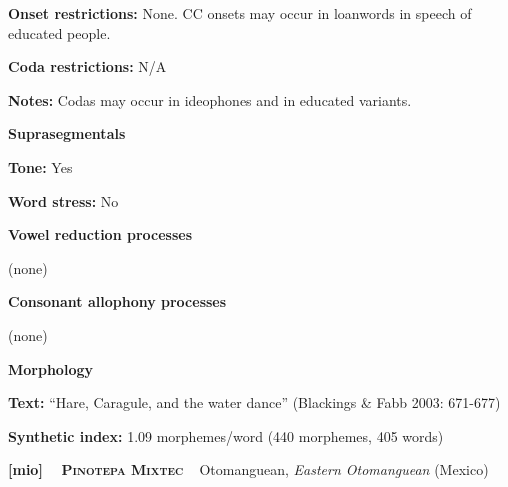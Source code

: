 \begin{styleBody}
\textbf{Onset restrictions:} None. CC onsets may occur in loanwords in speech of educated people.
\end{styleBody}

\begin{styleBody}
\textbf{Coda restrictions:} N/A
\end{styleBody}

\begin{styleBody}
\textbf{Notes: }Codas may occur in ideophones and in educated variants.
\end{styleBody}

\begin{styleBody}
\textbf{Suprasegmentals}
\end{styleBody}

\begin{styleBody}
\textbf{Tone:} Yes
\end{styleBody}

\begin{styleBody}
\textbf{Word stress: }No
\end{styleBody}

\begin{styleBody}
\textbf{Vowel reduction processes}
\end{styleBody}

\begin{styleBody}
(none)
\end{styleBody}

\begin{styleBody}
\textbf{Consonant allophony processes}
\end{styleBody}

\begin{styleBody}
(none)
\end{styleBody}

\begin{styleBody}
\textbf{Morphology}
\end{styleBody}

\begin{styleBody}
\textbf{Text:} “Hare, Caragule, and the water dance” (Blackings \& Fabb 2003: 671-677)
\end{styleBody}

\begin{styleBody}
\textbf{Synthetic index: }1.09 morphemes/word (440 morphemes, 405 words)
\end{styleBody}

\clearpage\begin{styleBody}
\textbf{[mio] }\ \ \textbf{\textsc{Pinotepa Mixtec}}\textbf{\ \ }Otomanguean, \textit{Eastern Otomanguean} (Mexico)
\end{styleBody}

